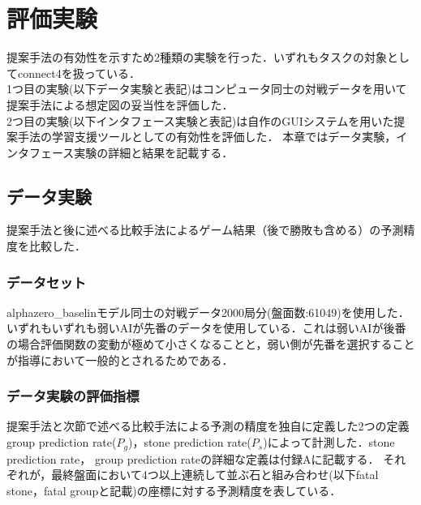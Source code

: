 \chapter{評価実験}
提案手法の有効性を示すため2種類の実験を行った．いずれもタスクの対象としてconnect4を扱っている．\\
1つ目の実験(以下データ実験と表記)はコンピュータ同士の対戦データを用いて提案手法による想定図の妥当性を評価した．\\
2つ目の実験(以下インタフェース実験と表記)は自作のGUIシステムを用いた提案手法の学習支援ツールとしての有効性を評価した．
本章ではデータ実験，インタフェース実験の詳細と結果を記載する．



\section{データ実験}
\label{chap:evaluation}
提案手法と後に述べる比較手法によるゲーム結果（後で勝敗も含める）の予測精度を比較した．
\subsection{データセット}
alphazero\_baselinモデル同士の対戦データ2000局分(盤面数:61049)を使用した．いずれもいずれも弱いAIが先番のデータを使用している．これは弱いAIが後番の場合評価関数の変動が極めて小さくなることと，弱い側が先番を選択することが指導において一般的とされるためである．



\subsection{データ実験の評価指標}
提案手法と次節で述べる比較手法による予測の精度を独自に定義した2つの定義group prediction rate($P_g$)，stone prediction rate($P_s$)によって計測した．stone prediction rate， group prediction rateの詳細な定義は付録Aに記載する．
それぞれが，最終盤面において4つ以上連続して並ぶ石と組み合わせ(以下fatal stone，fatal groupと記載)の座標に対する予測精度を表している．

